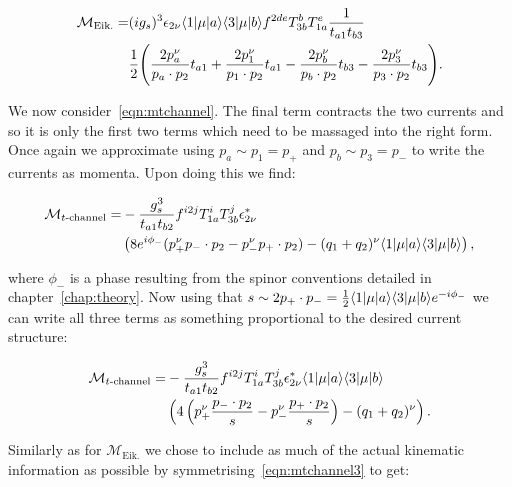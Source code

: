 		\begin{align}
		\begin{split}
			\mathcal{M}_{\text{Eik.}} = &(ig_s)^3 \epsilon_{2\nu} \langle 1 | \mu | a \rangle \langle 3 | \mu | b \rangle f^{2de}T^b_{3b}T^e_{1a}\frac{1}{t_{a1}t_{b3}}\\
			&\frac{1}{2}\Bigg(\frac{2p_a^\nu}{p_a\cdot p_2}t_{a1} + \frac{2p_1^\nu}{p_1\cdot p_2}t_{a1} -
			\frac{2p_b^\nu}{p_b\cdot p_2}t_{b3} - \frac{2p_3^\nu}{p_3\cdot p_2}t_{b3}\Bigg).
			\label{eq:fulltree4}
		\end{split}
		\end{align}

		We now consider~\eqref{eqn:mtchannel}.  The final term contracts the two currents and so it is
		only the first two terms which need to be massaged into the right form.  Once again we
		approximate using $p_a\sim p_1=p_+$ and $p_b\sim p_3=p_-$ to write the currents as momenta.
		Upon doing this we find:

		\begin{align}
		\begin{split}
			\mathcal{M}_{t\text{-channel}} = &-\frac{g_s^3}{t_{a1}t_{b2}}f^{i2j}T^i_{1a}T^j_{3b} \epsilon^*_{2\nu} \\
			&\left(8e^{i\phi_-}(p_+^\nu p_-\cdot p_2 - p_-^\nu p_+\cdot p_2) - (q_1 + q_2)^\nu \langle 1 | \mu | a \rangle\langle 3 | \mu | b \rangle \right),
			\label{eqn:mtchannel2}
		\end{split}
		\end{align}

		where $\phi_-$ is a phase resulting from the spinor conventions detailed in chapter~\ref{chap:theory}.
		Now using that $s\sim2p_+\cdot p_-=\frac{1}{2}\langle 1 | \mu | a \rangle\langle 3 | \mu | b \rangle e^{-i\phi_-}$ we can write all
		three terms as something proportional to the desired current structure:

		\begin{align}
		\begin{split}
			\mathcal{M}_{t\text{-channel}} = &-\frac{g_s^3}{t_{a1}t_{b2}}f^{i2j}T^i_{1a}T^j_{3b} \epsilon^*_{2\nu}
			\langle 1 | \mu | a \rangle\langle 3 | \mu | b \rangle \\&\left(4\left(p_+^\nu \frac{p_-\cdot p_2}{s} - p_-^\nu \frac{p_+\cdot p_2}{s}\right)
			- (q_1 + q_2)^\nu \right).
			\label{eqn:mtchannel3}
		\end{split}
		\end{align}

		Similarly as for $\mathcal{M}_{\text{Eik.}}$ we chose to include as much of the actual
		kinematic information as possible by symmetrising~\eqref{eqn:mtchannel3} to get:

